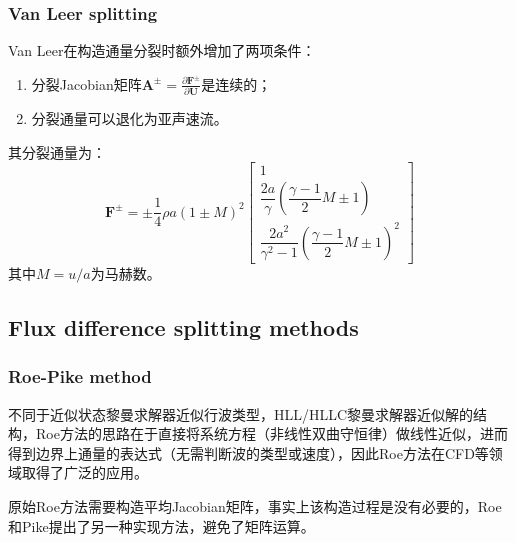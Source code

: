 \documentclass[11pt]{article}
\begin{document}
\subsubsection{Van Leer splitting}
Van Leer在构造通量分裂时额外增加了两项条件：
\begin{enumerate}[label=(\arabic*)]
	\item 分裂Jacobian矩阵$\bm{A}^\pm=\frac{\partial\bm{F}^\pm}{\partial\bm{U}}$是连续的；
	\item 分裂通量可以退化为亚声速流。
\end{enumerate}
其分裂通量为：
\begin{equation}
	\bm{F}^\pm=\pm\dfrac{1}{4}\rho a(1\pm M)^2\left[\begin{matrix}
			1                                                        \\
			\dfrac{2a}{\gamma}\left(\dfrac{\gamma-1}{2}M\pm 1\right) \\
			\dfrac{2a^2}{\gamma^2-1}\left(\dfrac{\gamma-1}{2}M\pm 1\right)^2
		\end{matrix}\right]
\end{equation}
其中$M=u/a$为马赫数。

\subsection{Flux difference splitting methods}
\subsubsection{Roe-Pike method}
不同于近似状态黎曼求解器近似行波类型，HLL/HLLC黎曼求解器近似解的结构，Roe方法的思路在于直接将系统方程（非线性双曲守恒律）做线性近似，进而得到边界上通量的表达式（无需判断波的类型或速度），因此Roe方法在CFD等领域取得了广泛的应用。

原始Roe方法需要构造平均Jacobian矩阵，事实上该构造过程是没有必要的，Roe和Pike提出了另一种实现方法，避免了矩阵运算。
\end{document}

